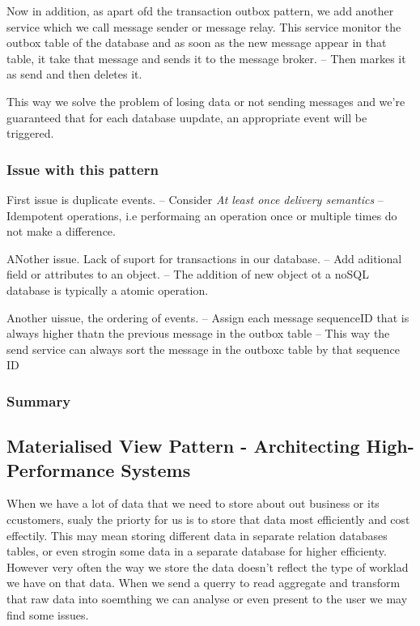 \documentclass[a4paper, 11pt]{book}
\begin{document}
    Now in addition, as apart ofd the transaction outbox pattern, we add another service which we call message sender or message relay.
    This service monitor the outbox table of the database and as soon as the new message appear in that table, it take that message and sends it to the message broker.
    -- Then markes it as send and then deletes it.

    This way we solve the problem of losing data or not sending messages and we're guaranteed that for each database uupdate, an appropriate event will be triggered.

    \subsubsection{Issue with this pattern}
    First issue is duplicate events.
    -- Consider \textit{At least once delivery semantics}
    -- Idempotent operations, i.e performaing an operation once or multiple times do not make a difference.

    ANother issue. Lack of suport for transactions in our database.
    -- Add aditional field or attributes to an object.
    -- The addition of new object ot a noSQL database is typically a atomic operation.

    Another uissue, the ordering of events.
    -- Assign each message sequenceID that is always higher thatn the previous message in the outbox table
    -- This way the send service can always sort the message in the outboxc table by that sequence ID

    \subsubsection{Summary}

    \subsection{Materialised View Pattern - Architecting High-Performance Systems}
    When we have a lot of data that we need to store about out business or its ccustomers, sualy the priorty for us is to store that data most efficiently and cost effectily.
    This may mean storing different data in separate relation databases tables, or even strogin some data in a separate database for higher efficienty.
    However very often the way we store the data doesn't reflect the type of worklad we have on that data.
    When we send a querry to read aggregate and transform that raw data into soemthing we can analyse or even present to the user we may find some issues.
\end{document}
